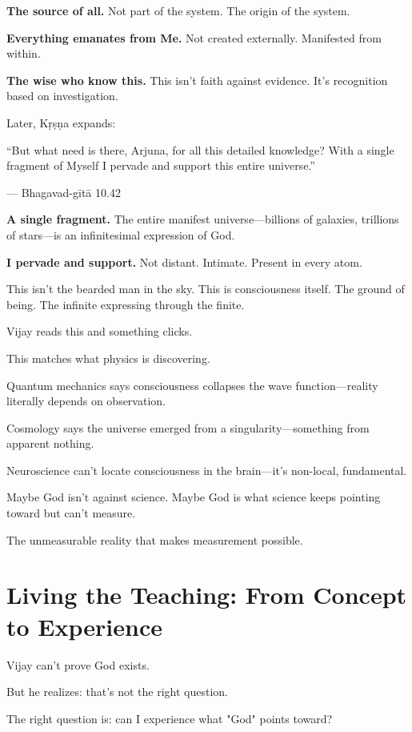 \documentclass[11pt,twoside]{book}
\begin{document}
\textbf{\textbf{The source of all.}} Not part of the system. The origin of the system.

\textbf{\textbf{Everything emanates from Me.}} Not created externally. Manifested from within.

\textbf{\textbf{The wise who know this.}} This isn't faith against evidence. It's recognition based on investigation.

Later, Kṛṣṇa expands:

\begin{pullquote}
``But what need is there, Arjuna, for all this detailed knowledge? With a single fragment of Myself I pervade and support this entire universe.''

--- Bhagavad-gītā 10.42
\end{pullquote}

\textbf{\textbf{A single fragment.}} The entire manifest universe—billions of galaxies, trillions of stars—is an infinitesimal expression of God.

\textbf{\textbf{I pervade and support.}} Not distant. Intimate. Present in every atom.

This isn't the bearded man in the sky. This is consciousness itself. The ground of being. The infinite expressing through the finite.

Vijay reads this and something clicks.

This matches what physics is discovering.

Quantum mechanics says consciousness collapses the wave function—reality literally depends on observation.

Cosmology says the universe emerged from a singularity—something from apparent nothing.

Neuroscience can't locate consciousness in the brain—it's non-local, fundamental.

Maybe God isn't against science. Maybe God is what science keeps pointing toward but can't measure.

The unmeasurable reality that makes measurement possible.

\section*{Living the Teaching: From Concept to Experience}

Vijay can't prove God exists.

But he realizes: that's not the right question.

The right question is: can I experience what "God" points toward?
\end{document}
